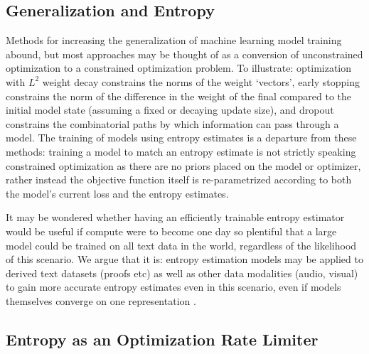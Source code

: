 \documentclass{article}
\begin{document}
    \subsection{Generalization and Entropy}

    Methods for increasing the generalization of machine learning model training abound, but most approaches may be thought of as a conversion of unconstrained optimization to a constrained optimization problem. To illustrate: optimization with $L^2$ weight decay constrains the norms of the weight `vectors', early stopping constrains the norm of the difference in the weight of the final compared to the initial model state (assuming a fixed or decaying update size), and dropout constrains the combinatorial paths by which information can pass through a model. The training of models using entropy estimates is a departure from these methods: training a model to match an entropy estimate is not strictly speaking constrained optimization as there are no priors placed on the model or optimizer, rather instead the objective function itself is re-parametrized according to both the model's current loss and the entropy estimates. 

    It may be wondered whether having an efficiently trainable entropy estimator would be useful if compute were to become one day so plentiful that a large model could be trained on all text data in the world, regardless of the likelihood of this scenario. We argue that it is: entropy estimation models may be applied to derived text datasets (proofs etc) as well as other data modalities (audio, visual) to gain more accurate entropy estimates even in this scenario, even if models themselves converge on one representation \citep{huh2024platonicrepresentationhypothesis}. 

    \subsection{Entropy as an Optimization Rate Limiter}
\end{document}
